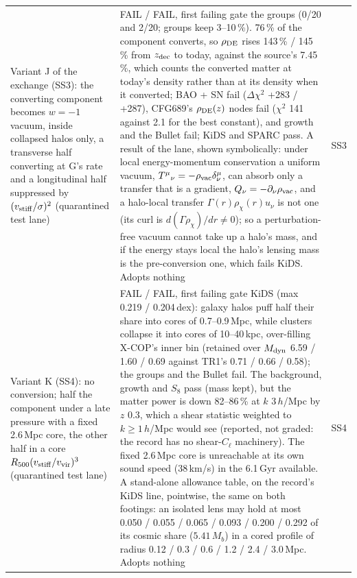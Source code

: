 \documentclass[10pt]{article}
\begin{document}
\begin{longtable}{@{}p{4.4cm}p{8.6cm}p{2.8cm}@{}}
Variant J of the exchange (SS3): the converting component becomes $w=-1$ vacuum, inside collapsed halos only, a transverse half converting at G's rate and a longitudinal half suppressed by $(v_{\rm stiff}/\sigma)^2$ (quarantined test lane) & FAIL / FAIL, first failing gate the groups (0/20 and 2/20; groups keep 3--10\,\%). 76\,\% of the component converts, so $\rho_{\rm DE}$ rises 143\,\% / 145\,\% from $z_{\rm dec}$ to today, against the source's 7.45\,\%, which counts the converted matter at today's density rather than at its density when it converted; BAO + SN fail ($\Delta\chi^2$ +283 / +287), CFG689's $\rho_{\rm DE}(z)$ nodes fail ($\chi^2$ 141 against 2.1 for the best constant), and growth and the Bullet fail; KiDS and SPARC pass. A result of the lane, shown symbolically: under local energy-momentum conservation a uniform vacuum, $T^\mu{}_\nu=-\rho_{\rm vac}\delta^\mu_\nu$, can absorb only a transfer that is a gradient, $Q_\nu=-\partial_\nu\rho_{\rm vac}$, and a halo-local transfer $\Gamma(r)\rho_\chi(r)u_\nu$ is not one (its curl is $d(\Gamma\rho_\chi)/dr\neq0$); so a perturbation-free vacuum cannot take up a halo's mass, and if the energy stays local the halo's lensing mass is the pre-conversion one, which fails KiDS. Adopts nothing & SS3\\
Variant K (SS4): no conversion; half the component under a late pressure with a fixed 2.6\,Mpc core, the other half in a core $R_{500}(v_{\rm stiff}/v_{\rm vir})^3$ (quarantined test lane) & FAIL / FAIL, first failing gate KiDS (max 0.219 / 0.204\,dex): galaxy halos puff half their share into cores of 0.7--0.9\,Mpc, while clusters collapse it into cores of 10--40\,kpc, over-filling X-COP's inner bin (retained over $M_{\rm dyn}$ 6.59 / 1.60 / 0.69 against TR1's 0.71 / 0.66 / 0.58); the groups and the Bullet fail. The background, growth and $S_8$ pass (mass kept), but the matter power is down 82--86\,\% at $k$ 3\,$h$/Mpc by $z$ 0.3, which a shear statistic weighted to $k\ge1\,h$/Mpc would see (reported, not graded: the record has no shear-$C_\ell$ machinery). The fixed 2.6\,Mpc core is unreachable at its own sound speed (38\,km/s) in the 6.1\,Gyr available. A stand-alone allowance table, on the record's KiDS line, pointwise, the same on both footings: an isolated lens may hold at most 0.050 / 0.055 / 0.065 / 0.093 / 0.200 / 0.292 of its cosmic share ($5.41\,M_b$) in a cored profile of radius 0.12 / 0.3 / 0.6 / 1.2 / 2.4 / 3.0\,Mpc. Adopts nothing & SS4\\

\end{longtable}
\end{document}
